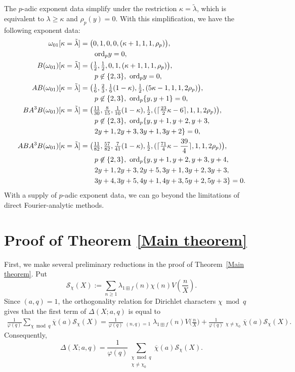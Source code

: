 \documentclass[11pt,reqno]{amsart}
\numberwithin{equation}{section}
\theoremstyle{plain}
\theoremstyle{definition}
\newcommand{\ord}{\mathrm{ord}}
\begin{document}
The $p$-adic exponent data simplify under the restriction $\kappa = \tilde{\lambda}$, which is equivalent to $\lambda \geqslant \kappa$ and $\rho_p(y) = 0$. With this simplification, we have the following exponent data:
\begin{align*}
\omega_{01}[\kappa=\tilde{\lambda}]&=\big(0,1,0,0,(\kappa+1,1,1,\rho_p)\big),\\
&\qquad \ord_py=0,\\
B(\omega_{01})[\kappa=\tilde{\lambda}]&=\big(\tfrac12,\tfrac12,0,1,(\kappa+1,1,1,\rho_p)\big),\\
&\qquad p\not\in\{2,3\},\,\,\ord_py=0,\\
AB(\omega_{01})[\kappa=\tilde{\lambda}]&=\big(\tfrac16,\tfrac23,\tfrac16(1-\kappa),\tfrac12,(5\kappa-1,1,1,2\rho_p)\big),\\
&\qquad p\not\in\{2,3\},\,\,\ord_p\{y,y+1\}=0,\\
 BA^3B(\omega_{01})[\kappa=\tilde{\lambda}]&=\big(\tfrac{11}{30},
 \tfrac{8}{15},\tfrac1{10}(1-\kappa),\tfrac12,
 (\lceil\tfrac{23}2\kappa-6\rceil,1,1,2\rho_p)\big),\\
&\qquad p\not\in\{2,3\},\,\,{\rm ord}_p\{y,y+1,y+2,y+3,\\
& \qquad 2y+1,2y+3,3y+1,3y+2\}=0,\\
ABA^3B(\omega_{01})[\kappa=\tilde{\lambda}]&=\big(\tfrac{11}{82},
 \tfrac{57}{82},\tfrac7{41}(1-\kappa),\tfrac12,
 (\lceil\tfrac{71}4\kappa-\frac{39}{4}\rceil,1,1,2\rho_p)\big),\\
&\qquad p\not\in\{2,3\},\,\,{\rm ord}_p\{y,y+1,y+2,y+3,y+4,\\
&\qquad 2y+1,2y+3,2y+5,3y+1,3y+2,3y+3,\\&\qquad3y+4,3y+5,4y+1,4y+3,5y+2,5y+3\}=0.
\end{align*}
With a supply of $p$-adic exponent data, we can go beyond the limitations of direct Fourier-analytic methods.

\section{Proof of Theorem \ref{Main theorem}}
First, we make several preliminary reductions in the proof of Theorem~\ref{Main theorem}.
Put
\[
\mathcal{S}_\chi(X):=\sum_{n\geq 1}
\lambda_{1\boxplus f}(n)\chi(n)V\left(\frac{n}{X}\right).
\]
Since $(a,q)=1$, the orthogonality relation for Dirichlet
characters $\chi\bmod q$ gives that the first term of $\Delta(X;a,q)$ is equal to
\begin{equation*}
\begin{split}
\frac{1}{\varphi(q)}\sum_{\chi\bmod q}\overline{\chi}(a)\mathcal{S}_\chi(X)
=\frac{1}{\varphi(q)} \mathop{\sum_{n\geq 1}}_{(n,q)=1}
\lambda_{1\boxplus f}(n)V\big(\frac{n}{X}\big)+\frac{1}{\varphi(q)}
\mathop{\sum_{\chi\bmod  q}}_{\chi\neq\chi_0}
\overline{\chi}(a)\mathcal{S}_{\chi}(X).
\end{split}\end{equation*}
Consequently,
\begin{equation}\label{character-decomposition}
\Delta(X;a,q)
=
\frac{1}{\varphi(q)}
\sum_{\substack{\chi\bmod q\\ \chi\neq\chi_0}}
\overline{\chi}(a)\mathcal{S}_\chi(X).
\end{equation}
\end{document}

